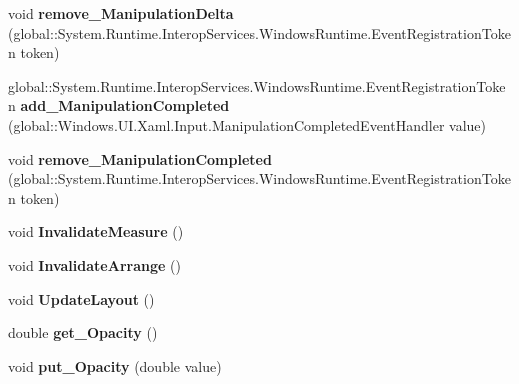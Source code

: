 \begin{DoxyCompactItemize}
void {\bfseries remove\+\_\+\+Manipulation\+Delta} (global\+::\+System.\+Runtime.\+Interop\+Services.\+Windows\+Runtime.\+Event\+Registration\+Token token)
\item 
\mbox{\label{interface_windows_1_1_u_i_1_1_xaml_1_1_i_u_i_element_a359638bee7a6419a6b037cbd2981ae94}} 
global\+::\+System.\+Runtime.\+Interop\+Services.\+Windows\+Runtime.\+Event\+Registration\+Token {\bfseries add\+\_\+\+Manipulation\+Completed} (global\+::\+Windows.\+U\+I.\+Xaml.\+Input.\+Manipulation\+Completed\+Event\+Handler value)
\item 
\mbox{\label{interface_windows_1_1_u_i_1_1_xaml_1_1_i_u_i_element_a2e0443d9216898f5abc1ba06ac3d0404}} 
void {\bfseries remove\+\_\+\+Manipulation\+Completed} (global\+::\+System.\+Runtime.\+Interop\+Services.\+Windows\+Runtime.\+Event\+Registration\+Token token)
\item 
\mbox{\label{interface_windows_1_1_u_i_1_1_xaml_1_1_i_u_i_element_aac9b9aec43687960735502a35820466d}} 
void {\bfseries Invalidate\+Measure} ()
\item 
\mbox{\label{interface_windows_1_1_u_i_1_1_xaml_1_1_i_u_i_element_aac9b7aa8b7e9841562d377013cf574d7}} 
void {\bfseries Invalidate\+Arrange} ()
\item 
\mbox{\label{interface_windows_1_1_u_i_1_1_xaml_1_1_i_u_i_element_af7acd3e9383678b8386d4a908b7037ea}} 
void {\bfseries Update\+Layout} ()
\item 
\mbox{\label{interface_windows_1_1_u_i_1_1_xaml_1_1_i_u_i_element_ac73e763417220d829b8a2b5951828438}} 
double {\bfseries get\+\_\+\+Opacity} ()
\item 
\mbox{\label{interface_windows_1_1_u_i_1_1_xaml_1_1_i_u_i_element_a12fcaa6862ab54ca2e8c1537879d0fd8}} 
void {\bfseries put\+\_\+\+Opacity} (double value)
\item 
\mbox{\label{interface_windows_1_1_u_i_1_1_xaml_1_1_i_u_i_element_a3ac32c6dc006288e8edab536fce2cba9}} 

\end{DoxyCompactItemize}
